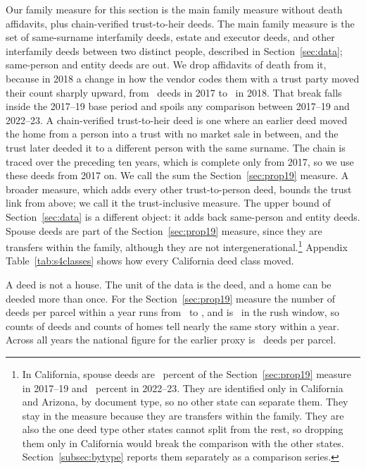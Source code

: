 Our family measure for this section is the main family measure without death affidavits, plus chain-verified trust-to-heir deeds. The main family measure is the set of same-surname interfamily deeds, estate and executor deeds, and other interfamily deeds between two distinct people, described in Section~\ref{sec:data}; same-person and entity deeds are out. We drop affidavits of death from it, because in 2018 a change in how the vendor codes them with a trust party moved their count sharply upward, from \SIIIAfTrustCATwentySeventeen\ deeds in 2017 to \SIIIAfTrustCATwentyEighteen\ in 2018. That break falls inside the 2017--19 base period and spoils any comparison between 2017--19 and 2022--23. A chain-verified trust-to-heir deed is one where an earlier deed moved the home from a person into a trust with no market sale in between, and the trust later deeded it to a different person with the same surname. The chain is traced over the preceding ten years, which is complete only from 2017, so we use these deeds from 2017 on. We call the sum the Section~\ref{sec:prop19} measure. A broader measure, which adds every other trust-to-person deed, bounds the trust link from above; we call it the trust-inclusive measure. The upper bound of Section~\ref{sec:data} is a different object: it adds back same-person and entity deeds. Spouse deeds are part of the Section~\ref{sec:prop19} measure, since they are transfers within the family, although they are not intergenerational.\footnote{In California, spouse deeds are \SIVSpouseShareMainPre\ percent of the Section~\ref{sec:prop19} measure in 2017--19 and \SIVSpouseShareMainPost\ percent in 2022--23. They are identified only in California and Arizona, by document type, so no other state can separate them. They stay in the measure because they are transfers within the family. They are also the one deed type other states cannot split from the rest, so dropping them only in California would break the comparison with the other states. Section~\ref{subsec:bytype} reports them separately as a comparison series.} Appendix Table~\ref{tab:s4classes} shows how every California deed class moved.

A deed is not a house. The unit of the data is the deed, and a home can be deeded more than once. For the Section~\ref{sec:prop19} measure the number of deeds per parcel within a year runs from \SIVDeedsPerParcelYearMin\ to \SIVDeedsPerParcelYearMax, and is \SIVDeedsPerParcelRush\ in the rush window, so counts of deeds and counts of homes tell nearly the same story within a year. Across all years the national figure for the earlier proxy is \SIVDeedsPerParcelNational\ deeds per parcel.


